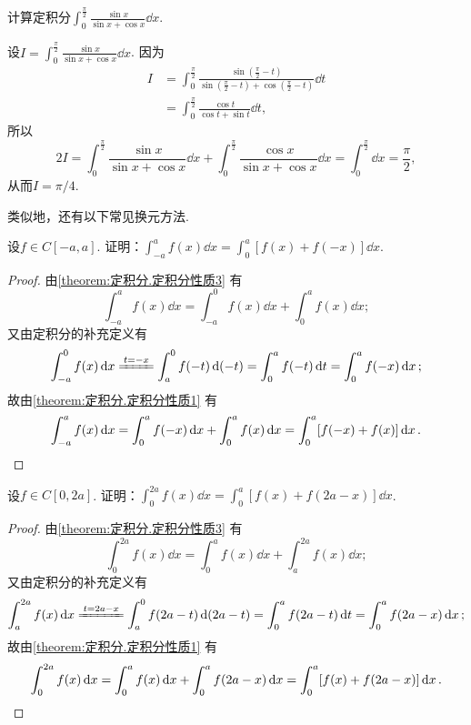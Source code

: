 \begin{example}
计算定积分\(\int_0^{\frac{\pi}{2}} \frac{\sin x}{\sin x + \cos x} \dd{x}\).
\begin{solution}
设\(I = \int_0^{\frac{\pi}{2}} \frac{\sin x}{\sin x + \cos x} \dd{x}\).
因为
\begin{align*}
I &= \int_0^{\frac{\pi}{2}} \frac{\sin\left(\frac{\pi}{2}-t\right)}{\sin\left(\frac{\pi}{2}-t\right) + \cos\left(\frac{\pi}{2}-t\right)} \dd{t} \\
&= \int_0^{\frac{\pi}{2}} \frac{\cos t}{\cos t + \sin t} \dd{t},
\end{align*}
所以\[
2 I = \int_0^{\frac{\pi}{2}} \frac{\sin x}{\sin x + \cos x} \dd{x} + \int_0^{\frac{\pi}{2}} \frac{\cos x}{\sin x + \cos x} \dd{x}
= \int_0^{\frac{\pi}{2}} \dd{x}
= \frac{\pi}{2},
\]从而\(I = \pi/4\).
\end{solution}
\end{example}

类似地，还有以下常见换元方法.
\begin{example}
设\(f \in C[-a,a]\).
证明：\(\int_{-a}^a f(x) \dd{x} = \int_0^a [f(x) + f(-x)] \dd{x}\).
\begin{proof}
由\cref{theorem:定积分.定积分性质3} 有\[
\int_{-a}^a f(x) \dd{x}
= \int_{-a}^0 f(x) \dd{x} + \int_0^a f(x) \dd{x};
\]又由定积分的补充定义有\[
\int_{-a}^0 f(x) \dd{x}
\xlongequal{t=-x} \int_a^0 f(-t) \dd(-t)
= \int_0^a f(-t) \dd{t}
= \int_0^a f(-x) \dd{x};
\]故由\cref{theorem:定积分.定积分性质1} 有\[
\int_{-a}^a f(x) \dd{x}
= \int_0^a f(-x) \dd{x} + \int_0^a f(x) \dd{x}
= \int_0^a [f(-x) + f(x)] \dd{x}.
\qedhere
\]
\end{proof}
\end{example}

\begin{example}
设\(f \in C[0,2a]\).
证明：\(\int_0^{2a} f(x) \dd{x} = \int_0^a [f(x) + f(2a-x)] \dd{x}\).
\begin{proof}
由\cref{theorem:定积分.定积分性质3} 有\[
\int_0^{2a} f(x) \dd{x}
= \int_0^a f(x) \dd{x} + \int_a^{2a} f(x) \dd{x};
\]又由定积分的补充定义有\[
\int_a^{2a} f(x) \dd{x}
\xlongequal{t=2a-x} \int_a^0 f(2a-t) \dd(2a-t)
= \int_0^a f(2a-t) \dd{t}
= \int_0^a f(2a-x) \dd{x};
\]故由\cref{theorem:定积分.定积分性质1} 有\[
\int_0^{2a} f(x) \dd{x}
= \int_0^a f(x) \dd{x} + \int_0^a f(2a-x) \dd{x}
= \int_0^a [f(x) + f(2a-x)] \dd{x}.
\qedhere
\]
\end{proof}
\end{example}

